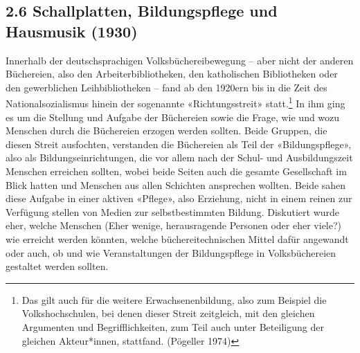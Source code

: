 \documentclass[a4paper,
fontsize=11pt,
oneside,
numbers=noperiodatend,
parskip=half-,
bibliography=totoc,
final
]{scrartcl}
\begin{document}
\hypertarget{schallplatten-bildungspflege-und-hausmusik-1930}{%
\subsection{2.6 Schallplatten, Bildungspflege und Hausmusik
(1930)}\label{schallplatten-bildungspflege-und-hausmusik-1930}}

Innerhalb der deutschsprachigen Volksbüchereibewegung -- aber nicht der
anderen Büchereien, also den Arbeiterbibliotheken, den katholischen
Bibliotheken oder den gewerblichen Leihbibliotheken -- fand ab den
1920ern bis in die Zeit des Nationalsozialismus hinein der sogenannte
«Richtungsstreit» statt.\footnote{Das gilt auch für die weitere
  Erwachsenenbildung, also zum Beispiel die Volkshochschulen, bei denen
  dieser Streit zeitgleich, mit den gleichen Argumenten und
  Begrifflichkeiten, zum Teil auch unter Beteiligung der gleichen
  Akteur*innen, stattfand. (Pögeller 1974)} In ihm ging es um die
Stellung und Aufgabe der Büchereien sowie die Frage, wie und wozu
Menschen durch die Büchereien erzogen werden sollten. Beide Gruppen, die
diesen Streit ausfochten, verstanden die Büchereien als Teil der
«Bildungspflege», also als Bildungseinrichtungen, die vor allem nach der
Schul- und Ausbildungszeit Menschen erreichen sollten, wobei beide
Seiten auch die gesamte Gesellschaft im Blick hatten und Menschen aus
allen Schichten ansprechen wollten. Beide sahen diese Aufgabe in einer
aktiven «Pflege», also Erziehung, nicht in einem reinen zur Verfügung
stellen von Medien zur selbstbestimmten Bildung. Diskutiert wurde eher,
welche Menschen (Eher wenige, herausragende Personen oder eher viele?)
wie erreicht werden könnten, welche büchereitechnischen Mittel dafür
angewandt oder auch, ob und wie Veranstaltungen der Bildungspflege in
Volksbüchereien gestaltet werden sollten.
\end{document}

